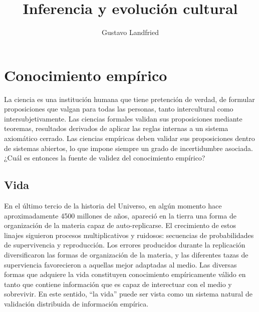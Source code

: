 \documentclass[a4paper,10pt]{book}
\title{\huge Inferencia y evolución cultural}
\author{Gustavo Landfried}
\begin{document}
\maketitle

\tableofcontents

\chapter{Conocimiento empírico}

La ciencia es una institución humana que tiene pretención de verdad, de formular proposiciones que valgan para todas las personas, tanto intercultural como intersubjetivamente.
Las ciencias formales validan sus proposiciones mediante teoremas, resultados derivados de aplicar las reglas internas a un sistema axiomático cerrado.
Las ciencias empíricas deben validar sus proposiciones dentro de sistemas abiertos, lo que impone siempre un grado de incertidumbre asociada.
¿Cuál es entonces la fuente de validez del conocimiento empírico?

\section{Vida}

En el último tercio de la historia del Universo, en algún momento hace aproximadamente 4500 millones de años, apareció en la tierra una forma de organización de la materia capaz de auto-replicarse.
El crecimiento de estos linajes siguieron procesos multiplicativos y ruidosos: secuencias de probabilidades de supervivencia y reproducción.
Los errores producidos durante la replicación diversificaron las formas de organización de la materia, y las diferentes tazas de superviencia favorecieron a aquellas mejor adaptadas al medio.
Las diversas formas que adquiere la vida constituyen conocimiento empíricamente válido en tanto que contiene información que es capaz de interectuar con el medio y sobrevivir.
En este sentido, ``la vida'' puede ser vista como un sistema natural de validación distribuida de información empírica.

\end{document}

